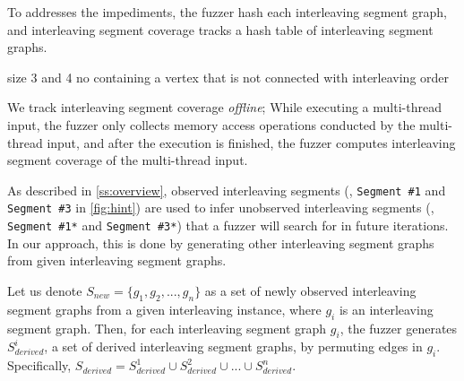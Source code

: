 To addresses the impediments, the fuzzer hash each interleaving
segment graph, and interleaving segment coverage tracks a hash table
of interleaving segment graphs.
%


%
size 3 and 4
%
no containing a vertex that is not connected with interleaving order



We track interleaving segment coverage \textit{offline}; While
executing a multi-thread input, the fuzzer only collects memory access
operations conducted by the multi-thread input, and after the
execution is finished, the fuzzer computes interleaving segment
coverage of the multi-thread input.



%
As described in \autoref{ss:overview}, observed interleaving segments
(\eg, \texttt{Segment \#1} and \texttt{Segment \#3} in
\autoref{fig:hint}) are used to infer unobserved interleaving segments
(\eg, \texttt{Segment \#1*} and \texttt{Segment \#3*}) that a fuzzer
will search for in future iterations.
%
In our approach, this is done by generating other interleaving segment
graphs from given interleaving segment graphs.

Let us denote $S_{new} = \{g_1, g_2, ..., g_n \}$ as a set of newly
observed interleaving segment graphs from a given interleaving
instance, where $g_i$ is an interleaving segment graph.
%
Then, for each interleaving segment graph $g_i$, the fuzzer generates
$S^{i}_{derived}$, a set of derived interleaving segment graphs, by
permuting edges in $g_i$.
%
Specifically, \dr{}
%
$S_{derived} = S^{1}_{derived} \cup S^{2}_{derived} \cup ... \cup
S^{n}_{derived}$.








